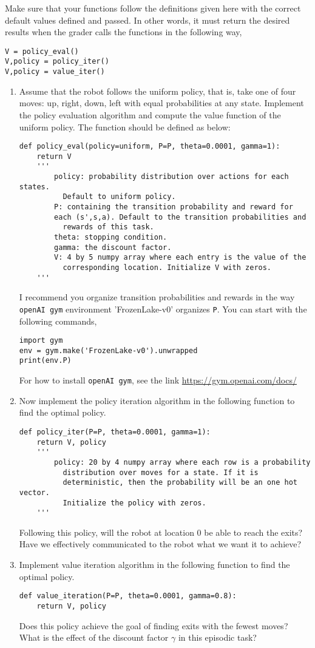 Make sure that your functions follow the definitions given here with
the correct default values defined and passed.
In other words, it must return the desired
results when the grader calls the functions in the following way,
\begin{verbatim}
V = policy_eval()
V,policy = policy_iter()
V,policy = value_iter()
\end{verbatim}
\begin{enumerate}
    \item Assume that the robot follows the uniform policy, that is,
    take one of four moves: up, right, down, left
    with equal probabilities at any state. Implement the policy evaluation
    algorithm and compute the value function of the uniform policy.
    The function should be defined as below:
    \begin{verbatim}
def policy_eval(policy=uniform, P=P, theta=0.0001, gamma=1):
    return V
    '''
        policy: probability distribution over actions for each states.
          Default to uniform policy.
        P: containing the transition probability and reward for
        each (s',s,a). Default to the transition probabilities and
          rewards of this task.
        theta: stopping condition.
        gamma: the discount factor.
        V: 4 by 5 numpy array where each entry is the value of the
          corresponding location. Initialize V with zeros.
    '''
    \end{verbatim}
    I recommend you organize transition probabilities and rewards in the way
    \texttt{openAI gym} environment 'FrozenLake-v0' organizes \texttt{P}.
    You can start with the following commands,
    \begin{verbatim}
import gym
env = gym.make('FrozenLake-v0').unwrapped
print(env.P)
    \end{verbatim}
    For how to install \texttt{openAI gym}, see the link
    \url{https://gym.openai.com/docs/}

    \item Now implement the policy iteration algorithm in the following
    function to find the optimal policy.
    \begin{verbatim}
def policy_iter(P=P, theta=0.0001, gamma=1):
    return V, policy
    '''
        policy: 20 by 4 numpy array where each row is a probability
          distribution over moves for a state. If it is
          deterministic, then the probability will be an one hot vector.
          Initialize the policy with zeros.
    '''
    \end{verbatim}
    Following this policy, will the robot at location 0 be able to reach the
    exits? Have we effectively communicated to the robot what we want it to
    achieve?

    \item Implement value iteration algorithm in the following
    function to find the optimal policy.
    \begin{verbatim}
def value_iteration(P=P, theta=0.0001, gamma=0.8):
    return V, policy
    \end{verbatim}
    Does this policy achieve the goal of finding exits with the fewest moves?
    What is the effect of the discount factor $ \gamma $ in this episodic
    task?
\end{enumerate}
